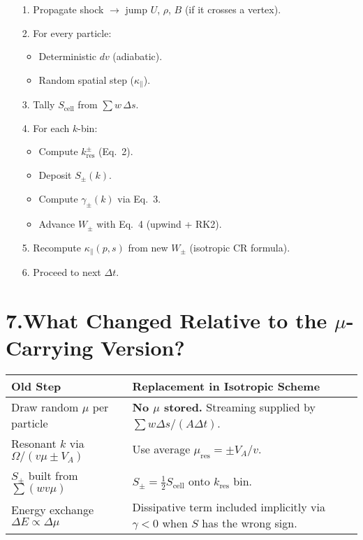 \begin{itemize}
\item[1.] Propagate shock $\rightarrow$ jump $U$, $\rho$, $B$ (if it crosses a vertex).
\item[2.] For every particle:
    \begin{itemize}
    \item Deterministic $dv$ (adiabatic).
    \item Random spatial step ($\kappa_\parallel$).
    \end{itemize}
\item[3.] Tally $S_{\text{cell}}$ from $\sum w \, \Delta s$.
\item[4.] For each $k$-bin:
    \begin{itemize}
    \item Compute $k_{\text{res}}^{\pm}$ (Eq.~2).
    \item Deposit $S_\pm(k)$.
    \item Compute $\gamma_\pm(k)$ via Eq.~3.
    \item Advance $W_\pm$ with Eq.~4 (upwind + RK2).
    \end{itemize}
\item[5.] Recompute $\kappa_\parallel(p,s)$ from new $W_\pm$ (isotropic CR formula).
\item[6.] Proceed to next $\Delta t$.
\end{itemize}

\section*{7.\quad What Changed Relative to the $\mu$-Carrying Version?}

\begin{tabular}{|l|p{10cm}|}
\hline
\textbf{Old Step} & \textbf{Replacement in Isotropic Scheme} \\
\hline
Draw random $\mu$ per particle & \textbf{No $\mu$ stored.} Streaming supplied by $\sum w \Delta s / (A \Delta t)$. \\
Resonant $k$ via $\Omega / (v \mu \pm V_A)$ & Use average $\mu_{\text{res}} = \pm V_A / v$. \\
$S_\pm$ built from $\sum (w v \mu)$ & $S_\pm = \frac{1}{2} S_{\text{cell}}$ onto $k_{\text{res}}$ bin. \\
Energy exchange $\Delta E \propto \Delta \mu$ & Dissipative term included implicitly via $\gamma < 0$ when $S$ has the wrong sign. \\
\hline
\end{tabular}

